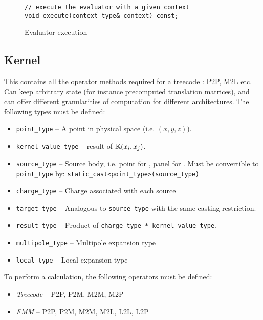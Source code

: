 \begin{figure*}[h]

\begin{lstlisting}
// execute the evaluator with a given context
void execute(context_type& context) const;
\end{lstlisting}
\caption{Evaluator execution}
\label{code:evaluator}
\end{figure*}

\subsection{Kernel}\label{subsec:kernel}

This contains all the operator methods required for a treecode \/{\fmm}: P2P, M2L etc. Can keep arbitrary state (for instance precomputed translation matrices), and can offer different granularities of computation for different architectures. The following types must be defined:

\begin{itemize}

\item {\lstinline|point_type|} -- A point in physical space (i.e. $(x,y,z)$).
\item {\lstinline|kernel_value_type|} -- result of $\mathbb{K}(x_i, x_j)$.
\item {\lstinline|source_type|} -- Source body, i.e. point for {\fmm}, panel for {\bem}. Must be convertible to {\lstinline|point_type|} by: {\lstinline|static_cast<point_type>(source_type)|}
\item {\lstinline|charge_type|} -- Charge associated with each source
\item {\lstinline|target_type|} -- Analogous to {\lstinline|source_type|} with the same casting restriction.
\item {\lstinline|result_type|} -- Product of {\lstinline|charge_type * kernel_value_type|}.
\item {\lstinline|multipole_type|} -- Multipole expansion type
\item {\lstinline|local_type|} -- Local expansion type

\end{itemize}

\noindent
To perform a calculation, the following operators must be defined:

\begin{itemize}

\item \emph{Treecode} -- P2P, P2M, M2M, M2P
\item \emph{FMM} -- P2P, P2M, M2M, M2L, L2L, L2P

\end{itemize}

